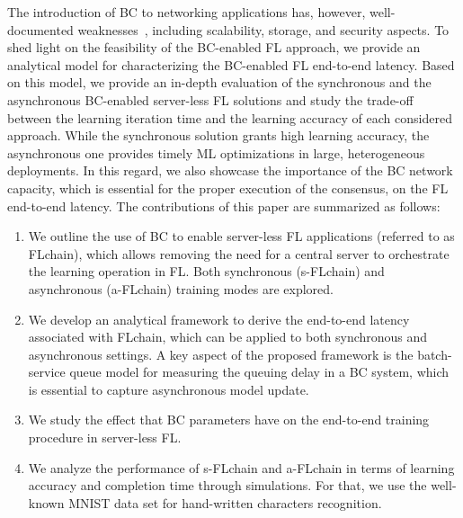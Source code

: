 \documentclass[10pt,journal,compsoc]{IEEEtran}
\begin{document}
The introduction of BC to networking applications has, however, well-documented weaknesses~\cite{zheng2018blockchain}, including scalability, storage, and security aspects. To shed light on the feasibility of the BC-enabled FL approach, we provide an analytical model for characterizing the BC-enabled FL end-to-end latency. Based on this model, we provide an in-depth evaluation of the synchronous and the asynchronous BC-enabled server-less FL solutions and study the trade-off between the learning iteration time and the learning accuracy of each considered approach. While the synchronous solution grants high learning accuracy, the asynchronous one provides timely ML optimizations in large, heterogeneous deployments. In this regard, we also showcase the importance of the BC network capacity, which is essential for the proper execution of the consensus, on the FL end-to-end latency. The contributions of this paper are summarized as follows:
\begin{enumerate}
	\item We outline the use of BC to enable server-less FL applications (referred to as FLchain), which allows removing the need for a central server to orchestrate the learning operation in FL. Both synchronous (s-FLchain) and asynchronous (a-FLchain) training modes are explored.
	\item We develop an analytical framework to derive the end-to-end latency associated with FLchain, which can be applied to both synchronous and asynchronous settings. A key aspect of the proposed framework is the batch-service queue model for measuring the queuing delay in a BC system, which is essential to capture asynchronous model update.
	\item We study the effect that BC parameters have on the end-to-end training procedure in server-less FL.
	\item We analyze the performance of s-FLchain and a-FLchain in terms of learning accuracy and completion time through simulations. For that, we use the well-known MNIST data set for hand-written characters recognition.
\end{enumerate}

\end{document}
